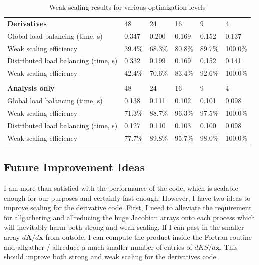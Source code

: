 \documentclass[11pt,letterpaper]{article}
\begin{document}
  \begin{table}[]
    \centering
    \begin{tabular}{llllll}
    \textbf{Derivatives}                                      & 48    & 24    & 16    & 9     & 4      \\ \cline{2-6}
    \multicolumn{1}{l|}{Global load balancing (time, s)}      & 0.347 & 0.200 & 0.169 & 0.152 & 0.137  \\
    \multicolumn{1}{l|}{Weak scaling efficiency}              & 39.4\%& 68.3\%& 80.8\%& 89.7\%& 100.0\%\\
    \multicolumn{1}{l|}{Distributed load balancing (time, s)} & 0.332 & 0.199 & 0.169 & 0.152 & 0.141  \\
    \multicolumn{1}{l|}{Weak scaling efficiency}              & 42.4\%& 70.6\%& 83.4\%& 92.6\%& 100.0\%\\
    \multicolumn{1}{l|}{}                                     &       &       &       &       &        \\
    \multicolumn{1}{l|}{\textbf{Analysis only}}               & 48    & 24    & 16    & 9     & 4      \\
    \multicolumn{1}{l|}{Global load balancing (time, s)}      & 0.138 & 0.111 & 0.102 & 0.101 & 0.098  \\
    \multicolumn{1}{l|}{Weak scaling efficiency}              & 71.3\%& 88.7\%& 96.3\%& 97.5\%& 100.0\%\\
    \multicolumn{1}{l|}{Distributed load balancing (time, s)} & 0.127 & 0.110 & 0.103 & 0.100 & 0.098  \\
    \multicolumn{1}{l|}{Weak scaling efficiency}              & 77.7\%& 89.8\%& 95.7\%& 98.0\%& 100.0\%
  \end{tabular}
  \caption{Weak scaling results for various optimization levels}
    \label{tab:weakscaling}
\end{table}


\subsection{Future Improvement Ideas}
\qquad I am more than satisfied with the performance of the code, which is scalable enough for our purposes and certainly fast enough.
However, I have two ideas to improve scaling for the derivative code.
First, I need to alleviate the requirement for allgathering and allreducing the huge Jacobian arrays onto each process which will inevitably harm both strong and weak scaling.
If I can pass in the smaller array $d\textbf{A}/d\textbf{x}$ from outside, I can compute the product inside the Fortran routine and allgather / allreduce a much smaller number of entries of $dKS/d\textbf{x}$.
This should improve both strong and weak scaling for the derivatives code.
\end{document}

